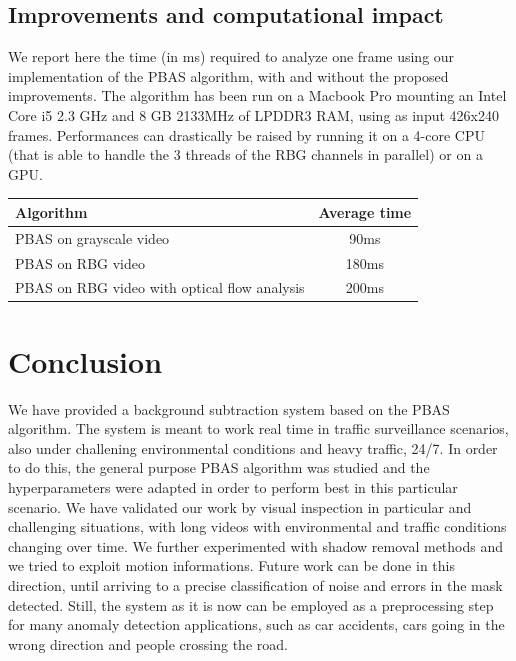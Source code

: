 \subsection*{Improvements and computational impact}
We report here the time (in ms) required to analyze one frame using our implementation of the PBAS algorithm, with and without the proposed improvements. The algorithm has been run on a Macbook Pro mounting an Intel Core i5 2.3 GHz and 8 GB 2133MHz of LPDDR3 RAM, using as input 426x240 frames. Performances can drastically be raised by running it on a 4-core CPU (that is able to handle the 3 threads of the RBG channels in parallel) or on a GPU.

\begin{table}[]
\begin{tabular}{l|c}
    Algorithm                                     & Average time \\
    \hline
    PBAS on grayscale video                       & 90ms         \\
    PBAS on RBG video                             & 180ms        \\
    PBAS on RBG video with optical flow analysis  & 200ms        
\end{tabular}
\end{table}

\section*{Conclusion}
We have provided a background subtraction system based on the PBAS algorithm. The system is meant to work real time in traffic surveillance scenarios, also under challening environmental conditions and heavy traffic, 24/7. In order to do this, the general purpose PBAS algorithm was studied and the hyperparameters were adapted in order to perform best in this particular scenario. We have validated our work by visual inspection in particular and challenging situations, with long videos with environmental and traffic conditions changing over time. We further experimented with shadow removal methods and we tried to exploit motion informations. Future work can be done in this direction, until arriving to a precise classification of noise and errors in the mask detected. Still, the system as it is now can be employed as a preprocessing step for many anomaly detection applications, such as car accidents, cars going in the wrong direction and people crossing the road.